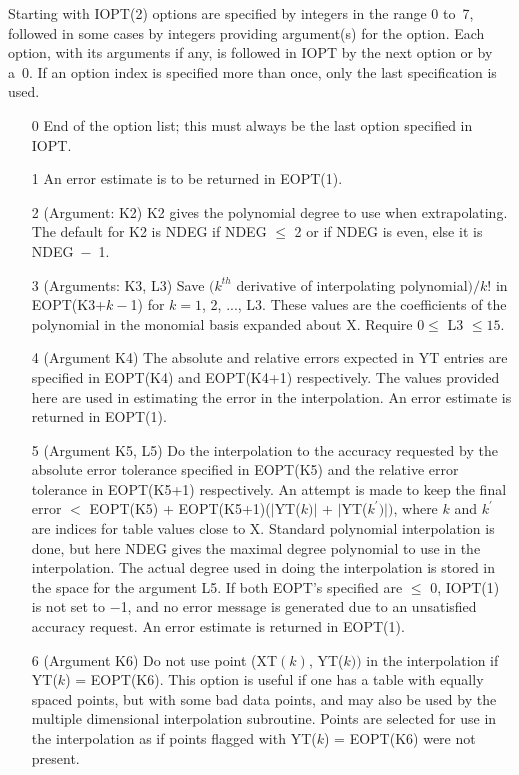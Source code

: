 \documentclass[twoside]{MATH77}
\begin{document}
\begin{description}
Starting with IOPT(2) options are specified by integers in the range 0 to~7,
followed in some cases by integers providing argument(s) for the option.
Each option, with its arguments if any, is followed in IOPT by the next
option or by a~0.  If an option index is specified more than once,
only the last specification is used.

\begin{itemize}
\item[0]  End of the option list; this must always be the last option
specified in IOPT.

\item[1]  An error estimate is to be returned in EOPT(1).

\item[2]  (Argument: K2) K2 gives the polynomial degree to use when
extrapolating. The default for K2 is NDEG if NDEG $\leq $ 2 or if NDEG is
even, else it is NDEG~$-$~1.

\item[3]  (Arguments: K3, L3) Save $(k^{th}$ derivative of interpolating
polynomial$)/k!$ in EOPT(K3+$k-$1) for $k=1$, 2, ..., L3. These values are
the coefficients of the polynomial in the monomial basis expanded about X.
Require $0\leq $ L3 $\leq 15.$

\item[4]  (Argument K4) The absolute and relative errors expected in YT
entries are specified in EOPT(K4) and EOPT(K4+1) respectively. The values
provided here are used in estimating the error in the interpolation. An
error estimate is returned in EOPT(1).

\item[5]  (Argument K5, L5) Do the interpolation to the accuracy requested
by the absolute error tolerance specified in EOPT(K5) and the relative error
tolerance in EOPT(K5+1) respectively. An attempt is made to keep the final
error $<$ EOPT(K5) + EOPT(K5+1)\thinspace ($|$YT($k)|$ + $|$YT($k^{\prime
})|)$, where $k$ and $k^{\prime }$ are indices for table values close to X.
Standard polynomial interpolation is done, but here NDEG gives the maximal
degree polynomial to use in the interpolation. The actual degree used in
doing the interpolation is stored in the space for the argument L5. If both
EOPT's specified are $\leq $ 0, IOPT(1) is not set to $-$1, and no error
message is generated due to an unsatisfied accuracy request. An error
estimate is returned in EOPT(1).

\item[6]  (Argument K6) Do not use point (XT$(k)$, YT($k))$ in the
interpolation if YT($k$) = EOPT(K6). This option is useful if one has a table
with equally spaced points, but with some bad data points, and may also be
used by the multiple dimensional interpolation subroutine. Points are
selected for use in the interpolation as if points flagged with YT($k$) =
EOPT(K6) were not present.


\end{itemize}
\end{description}
\end{document}
